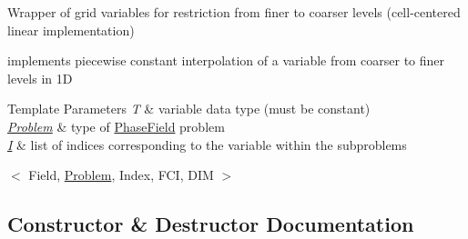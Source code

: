 Wrapper of grid variables for restriction from finer to coarser levels (cell-\/centered linear implementation) 

implements piecewise constant interpolation of a variable from coarser to finer levels in 1D


\begin{DoxyTemplParams}{Template Parameters}
{\em T} & variable data type (must be constant) \\
\hline
{\em \hyperlink{classUintah_1_1PhaseField_1_1Problem}{Problem}} & type of \hyperlink{namespaceUintah_1_1PhaseField}{Phase\+Field} problem \\
\hline
{\em \hyperlink{structUintah_1_1PhaseField_1_1I}{I}} & list of indices corresponding to the variable within the subproblems\\
\hline
\end{DoxyTemplParams}
$<$ Field, \hyperlink{classUintah_1_1PhaseField_1_1Problem}{Problem}, Index, F\+CI, D\+IM $>$ 

\subsection{Constructor \& Destructor Documentation}
\mbox{\label{classUintah_1_1PhaseField_1_1detail_1_1amr__restrictor_3_01ScalarField_3_01T_01_4_00_01Problem_0778720acc9a55f696b8537356a4dbcae_a660561d50c26f0cbed63979b4f04abca}} 
